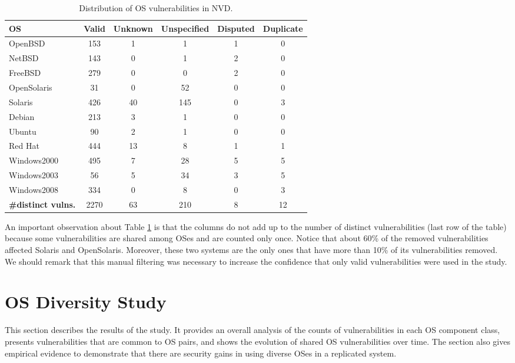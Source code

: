 \begin{table}[!ht]
\caption{Distribution of OS vulnerabilities in NVD.}
\label{tab:unknowns}
\begin{center}
{\scriptsize
\begin{tabular}{|l||c | c | c | c | c|}\hline
\textbf{OS} & \textbf{Valid} & \textbf{Unknown} & \textbf{Unspecified} & \textbf{Disputed} & \textbf{Duplicate}  \\\hline\hline %
OpenBSD & 153 & 1 & 1 & 1 & 0 \\
NetBSD & 143 & 0 & 1 & 2 & 0  \\
FreeBSD & 279 & 0 & 0 & 2 & 0 \\
OpenSolaris & 31 & 0 & 52 & 0 & 0  \\
Solaris & 426 & 40 & 145 & 0 & 3  \\
Debian & 213 & 3 & 1 & 0 & 0  \\
Ubuntu & 90 & 2 & 1 & 0 & 0  \\
Red Hat & 444 & 13 & 8 & 1 & 1  \\
Windows2000 & 495 & 7 & 28 & 5 & 5  \\
Windows2003 & 56 & 5 & 34 & 3 & 5  \\
Windows2008 & 334 & 0 & 8 & 0 & 3   \\\hline\hline
\textbf{\#distinct vulns.} & 2270 & 63 & 210 & 8 & 12 \\ \hline
\end{tabular}
}
\end{center}
\end{table}

An important observation about Table \ref{tab:unknowns} is that the columns do not add up to the number of distinct vulnerabilities (last row of the table) because some vulnerabilities are shared among OSes and are counted only once.
Notice that about 60\% of the removed vulnerabilities affected Solaris and OpenSolaris.
Moreover, these two systems are the only ones that have more than 10\% of its vulnerabilities removed.
We should remark that this manual filtering was necessary to increase the confidence that only valid vulnerabilities were used in the study.


\section{OS Diversity Study}\label{study}

This section describes the results of the study. It provides an overall analysis of the counts of vulnerabilities in each OS component class, presents vulnerabilities that are common to OS pairs, and shows the evolution of shared OS vulnerabilities over time. The section also gives empirical evidence to demonstrate that there are security gains in using diverse OSes in a replicated system.


